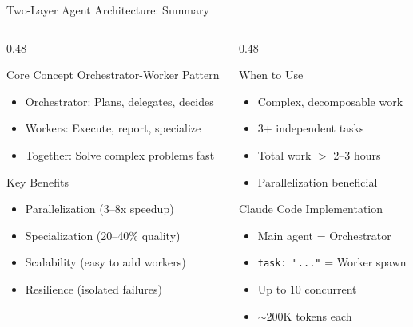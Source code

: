 \documentclass[aspectratio=169,11pt]{beamer}
\begin{document}
\begin{frame}{Two-Layer Agent Architecture: Summary}
\begin{columns}[T]
\begin{column}{0.48\textwidth}
\begin{block}{Core Concept}
Orchestrator-Worker Pattern
\begin{itemize}
    \item Orchestrator: Plans, delegates, decides
    \item Workers: Execute, report, specialize
    \item Together: Solve complex problems fast
\end{itemize}
\end{block}

\begin{exampleblock}{Key Benefits}
\begin{itemize}
    \item Parallelization (3--8x speedup)
    \item Specialization (20--40\% quality)
    \item Scalability (easy to add workers)
    \item Resilience (isolated failures)
\end{itemize}
\end{exampleblock}
\end{column}
\begin{column}{0.48\textwidth}
\begin{block}{When to Use}
\begin{itemize}
    \item Complex, decomposable work
    \item 3+ independent tasks
    \item Total work $>$ 2--3 hours
    \item Parallelization beneficial
\end{itemize}
\end{block}

\begin{block}{Claude Code Implementation}
\begin{itemize}
    \item Main agent = Orchestrator
    \item \texttt{task: "..."} = Worker spawn
    \item Up to 10 concurrent
    \item $\sim$200K tokens each
\end{itemize}
\end{block}
\end{column}
\end{columns}


\end{frame}
\end{document}
